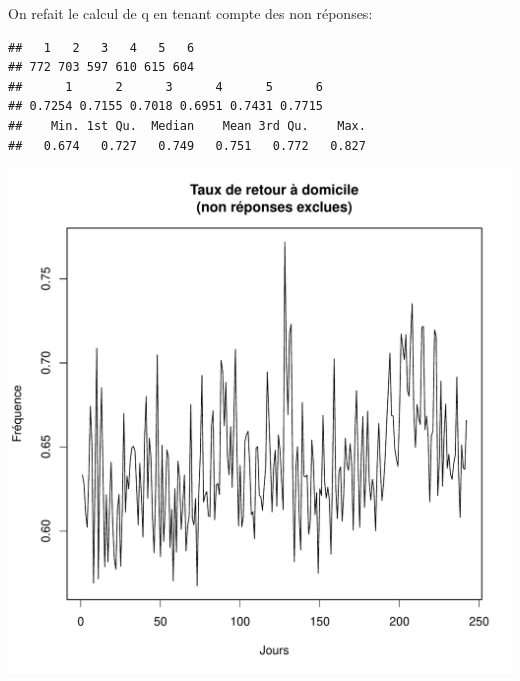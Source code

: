 \documentclass[12pt,english,french,twoside]{report}\usepackage[]{graphicx}\usepackage[]{color}
\makeatletter
\def\maxwidth{ %
  \ifdim\Gin@nat@width>\linewidth
    \linewidth
  \else
    \Gin@nat@width
  \fi
}
\newenvironment{kframe}{%
 \def\at@end@of@kframe{}%
 \ifinner\ifhmode%
  \def\at@end@of@kframe{\end{minipage}}%
  \begin{minipage}{\columnwidth}%
 \fi\fi%
 \def\FrameCommand##1{\hskip\@totalleftmargin \hskip-\fboxsep
 \colorbox{shadecolor}{##1}\hskip-\fboxsep
     \hskip-\linewidth \hskip-\@totalleftmargin \hskip\columnwidth}%
 \MakeFramed {\advance\hsize-\width
   \@totalleftmargin\z@ \linewidth\hsize
   \@setminipage}}%
 {\par\unskip\endMakeFramed%
 \at@end@of@kframe}
\newenvironment{knitrout}{}{} %
\makeatother
\begin{document}
On refait le calcul de q en tenant compte des non réponses:
\begin{knitrout}
\color{fgcolor}\begin{kframe}
\begin{verbatim}
##   1   2   3   4   5   6 
## 772 703 597 610 615 604
##      1      2      3      4      5      6 
## 0.7254 0.7155 0.7018 0.6951 0.7431 0.7715
##    Min. 1st Qu.  Median    Mean 3rd Qu.    Max. 
##   0.674   0.727   0.749   0.751   0.772   0.827
\end{verbatim}
\end{kframe}
\includegraphics[width=\maxwidth]{figure/retour_dom2} 

\end{knitrout}
\end{document}
